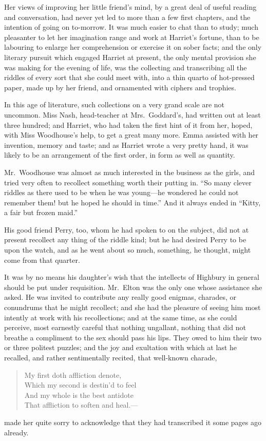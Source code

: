 Her views of improving her little friend's mind, by a great deal
of useful reading and conversation, had never yet led to more than
a few first chapters, and the intention of going on to-morrow.
It was much easier to chat than to study; much pleasanter to let
her imagination range and work at Harriet's fortune, than to be
labouring to enlarge her comprehension or exercise it on sober facts;
and the only literary pursuit which engaged Harriet at present,
the only mental provision she was making for the evening of life,
was the collecting and transcribing all the riddles of every sort
that she could meet with, into a thin quarto of hot-pressed paper,
made up by her friend, and ornamented with ciphers and trophies.

In this age of literature, such collections on a very grand scale
are not uncommon.  Miss Nash, head-teacher at Mrs.\ Goddard's,
had written out at least three hundred; and Harriet, who had taken
the first hint of it from her, hoped, with Miss Woodhouse's help,
to get a great many more.  Emma assisted with her invention,
memory and taste; and as Harriet wrote a very pretty hand,
it was likely to be an arrangement of the first order, in form
as well as quantity.

Mr.\ Woodhouse was almost as much interested in the business as the girls,
and tried very often to recollect something worth their putting in.
``So many clever riddles as there used to be when he was young---he
wondered he could not remember them! but he hoped he should in time.''
And it always ended in ``Kitty, a fair but frozen maid.''

His good friend Perry, too, whom he had spoken to on the subject,
did not at present recollect any thing of the riddle kind;
but he had desired Perry to be upon the watch, and as he went about
so much, something, he thought, might come from that quarter.

It was by no means his daughter's wish that the intellects of
Highbury in general should be put under requisition.  Mr.\ Elton
was the only one whose assistance she asked.  He was invited
to contribute any really good enigmas, charades, or conundrums
that he might recollect; and she had the pleasure of seeing him
most intently at work with his recollections; and at the same time,
as she could perceive, most earnestly careful that nothing ungallant,
nothing that did not breathe a compliment to the sex should pass
his lips.  They owed to him their two or three politest puzzles;
and the joy and exultation with which at last he recalled,
and rather sentimentally recited, that well-known charade,
\begin{verse}
    My first doth affliction denote,\\
      Which my second is destin'd to feel\\
    And my whole is the best antidote\\
      That affliction to soften and heal.---%
\end{verse}
made her quite sorry to acknowledge that they had transcribed it
some pages ago already.

